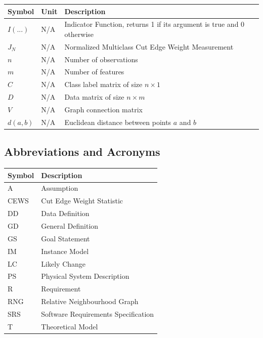 \documentclass[12pt]{article}
\begin{document}
\renewcommand{\arraystretch}{1.2}
\noindent \begin{longtable*}{l l p{12cm}} \toprule
\textbf{Symbol} & \textbf{Unit} & \textbf{Description}\\
\midrule 
$I(...)$ & N/A & Indicator Function, returns 1 if its argument is true and 0 otherwise \\ %
$J_N$ & N/A & Normalized Multiclass Cut Edge Weight Measurement \\
$n$ & N/A & Number of observations \\
$m$ & N/A & Number of features \\
$C$ & N/A & Class label matrix of size $n \times 1$\\
$D$ & N/A & Data matrix of size $n \times m$\\
$V$ & N/A & Graph connection matrix \\
$d(a, b)$ & N/A & Euclidean distance between points $a$ and $b$ \\
\bottomrule
\end{longtable*}

\subsection{Abbreviations and Acronyms}

\renewcommand{\arraystretch}{1.2}
\begin{tabular}{l l} 
  \toprule		
  \textbf{Symbol} & \textbf{Description}\\
  \midrule 
  A & Assumption\\
  CEWS & Cut Edge Weight Statistic\\
  DD & Data Definition\\
  GD & General Definition\\
  GS & Goal Statement\\
  IM & Instance Model\\
  LC & Likely Change\\
  PS & Physical System Description\\
  R & Requirement\\
  RNG & Relative Neighbourhood Graph\\
  SRS & Software Requirements Specification\\
  T & Theoretical Model\\
  \bottomrule
\end{tabular}\\
\end{document}

